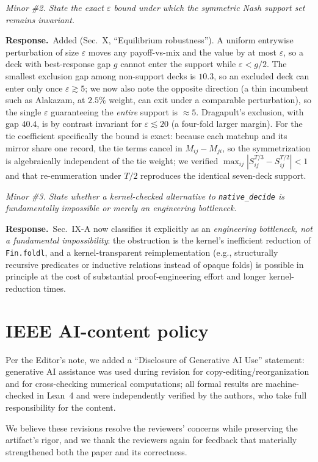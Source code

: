 \documentclass[11pt]{article}
\newcommand{\cmt}[1]{\par\smallskip\noindent\textit{#1}\par\smallskip}
\newcommand{\resp}{\par\noindent\textbf{Response.}\ }
\begin{document}
\cmt{Minor \#2. State the exact $\varepsilon$ bound under which the symmetric Nash
support set remains invariant.}
\resp Added (Sec.~X, ``Equilibrium robustness''). A uniform entrywise perturbation
of size $\varepsilon$ moves any payoff-vs-mix and the value by at most
$\varepsilon$, so a deck with best-response gap $g$ cannot enter the support while
$\varepsilon < g/2$. The smallest exclusion gap among non-support decks is
$10.3$\textperthousand, so an excluded deck can enter only once
$\varepsilon \gtrsim 5$\textperthousand; we now also note the opposite direction (a
thin incumbent such as Alakazam, at $2.5\%$ weight, can exit under a comparable
perturbation), so the single $\varepsilon$ guaranteeing the \emph{entire} support
is ${\approx}5$\textperthousand. Dragapult's exclusion, with gap
$40.4$\textperthousand, is by contrast invariant for $\varepsilon \lesssim 20$\textperthousand{}
(a four-fold larger margin). For the tie coefficient specifically the bound is
exact: because each matchup and its mirror share one record, the tie terms cancel
in $M_{ij}-M_{ji}$, so the symmetrization is algebraically independent of the tie
weight; we verified $\max_{ij}|S_{ij}^{T/3}-S_{ij}^{T/2}|<1$\textperthousand{} and
that re-enumeration under $T/2$ reproduces the identical seven-deck support.

\cmt{Minor \#3. State whether a kernel-checked alternative to \texttt{native\_decide}
is fundamentally impossible or merely an engineering bottleneck.}
\resp Sec.~IX-A now classifies it explicitly as an \emph{engineering bottleneck,
not a fundamental impossibility}: the obstruction is the kernel's inefficient
reduction of \texttt{Fin.foldl}, and a kernel-transparent reimplementation (e.g.,
structurally recursive predicates or inductive relations instead of opaque folds)
is possible in principle at the cost of substantial proof-engineering effort and
longer kernel-reduction times.

\hrulefill

\section*{IEEE AI-content policy}
Per the Editor's note, we added a ``Disclosure of Generative AI Use'' statement:
generative AI assistance was used during revision for copy-editing/reorganization
and for cross-checking numerical computations; all formal results are
machine-checked in Lean~4 and were independently verified by the authors, who take
full responsibility for the content.

\bigskip
We believe these revisions resolve the reviewers' concerns while preserving the
artifact's rigor, and we thank the reviewers again for feedback that materially
strengthened both the paper and its correctness.
\end{document}
